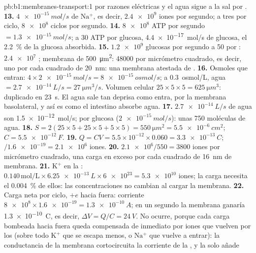 \begin{solution}{pb:b1:membranes-transport:1}
por razones eléctricas y el agua sigue a la sal por .
\textbf{13.} $\qty{4e-15}{mol/s}$ de $\mathrm{Na^+}$, es decir,
$\num{2.4e9}$ iones por segundo; a tres por ciclo, $\num{8e8}$ ciclos por
segundo.
\textbf{14.} $\num{8e8}$ ATP por segundo $= \qty{1.3e-15}{mol/s}$; a 30 ATP
por glucosa, \qty{4.4e-17}{mol/s} de glucosa, el \qty{2.2}{\%} de la glucosa
absorbida.
\textbf{15.} $\num{1.2e9}$ glucosas por segundo a 50 por :
$\num{2.4e7}$ ; membrana de \qty{500}{\micro m^2}: \num{48000}
por micrómetro cuadrado, es decir, uno por cada cuadrado de \qty{20}{nm}: una
membrana atestada de .
\textbf{16.} Osmoles que entran: $4\times\qty{2e-15}{mol/s} =
\qty{8e-15}{osmol/s}$; a \qty{0.3}{osmol/L}, agua
$= \qty{2.7e-14}{L/s} = \qty{27}{\micro m^3/s}$. Volumen celular
$25\times 5\times 5 = \qty{625}{\micro m^3}$: duplicado en \qty{23}{s}. El
agua sale tan deprisa como entra, por la membrana basolateral, y así es como
el intestino absorbe agua.
\textbf{17.} $\qty{2.7e-14}{L/s}$ de agua son \qty{1.5e-12}{mol/s}; por glucosa ($\qty{2e-15}{mol/s}$): unas 750 moléculas de agua.
\textbf{18.} $S = 2(25\times 5 + 25\times 5 + 5\times 5) =
\qty{550}{\micro m^2} = \qty{5.5e-6}{cm^2}$; $C = \qty{5.5e-12}{F}$.
\textbf{19.} $Q = CV = 5.5\times 10^{-12}\times 0.060 =
\qty{3.3e-13}{C}$; $/\num{1.6e-19} = \num{2.1e6}$ iones.
\textbf{20.} $\num{2.1e6}/550 = 3800$ iones por micrómetro cuadrado, una carga en exceso por cada cuadrado de \qty{16}{nm} de membrana.
\textbf{21.} $\mathrm{K^+}$ en la : $0.140\,\mathrm{mol/L}\times
\qty{6.25e-13}{L}\times\num{6e23} = \num{5.3e10}$ iones; la carga necesita
el \qty{0.004}{\%} de ellos: las concentraciones no cambian al cargar la
membrana.
\textbf{22.} Carga neta por ciclo, $+e$ hacia fuera: corriente
$\num{8e8}\times
\num{1.6e-19} = \qty{1.3e-10}{A}$; en un segundo la
membrana ganaría \qty{1.3e-10}{C}, es decir, $\Delta V = Q/C = \qty{24}{V}$.
No ocurre, porque cada carga bombeada hacia fuera queda compensada de
inmediato por iones que vuelven por los  (sobre todo $\mathrm{K^+}$
que se escapa menos, o $\mathrm{Na^+}$ que vuelve a entrar): la conductancia
de la membrana cortocircuita la corriente de la , y la  solo añade

\end{solution}
